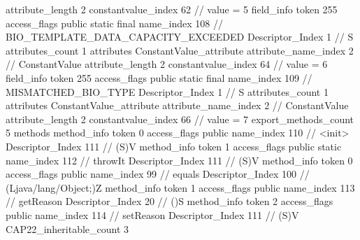{{{{{{{					attribute_length	2
					constantvalue_index	62		// value = 5
				}
				}
			}
			field_info {
				token	255
				access_flags	public static final
				name_index	108		// BIO_TEMPLATE_DATA_CAPACITY_EXCEEDED
				Descriptor_Index	1		// S
				attributes_count	1
				attributes {
				ConstantValue_attribute {
					attribute_name_index	2		// ConstantValue
					attribute_length	2
					constantvalue_index	64		// value = 6
				}
				}
			}
			field_info {
				token	255
				access_flags	public static final
				name_index	109		// MISMATCHED_BIO_TYPE
				Descriptor_Index	1		// S
				attributes_count	1
				attributes {
				ConstantValue_attribute {
					attribute_name_index	2		// ConstantValue
					attribute_length	2
					constantvalue_index	66		// value = 7
				}
				}
			}
			}
			export_methods_count	5
			methods {
				method_info {
					token	0
					access_flags	public
					name_index	110		// <init>
					Descriptor_Index	111		// (S)V
				}
				method_info {
					token	1
					access_flags	public static
					name_index	112		// throwIt
					Descriptor_Index	111		// (S)V
				}
				method_info {
					token	0
					access_flags	public
					name_index	99		// equals
					Descriptor_Index	100		// (Ljava/lang/Object;)Z
				}
				method_info {
					token	1
					access_flags	public
					name_index	113		// getReason
					Descriptor_Index	20		// ()S
				}
				method_info {
					token	2
					access_flags	public
					name_index	114		// setReason
					Descriptor_Index	111		// (S)V
				}
			}
			CAP22_inheritable_count	3
		}
	}
}
